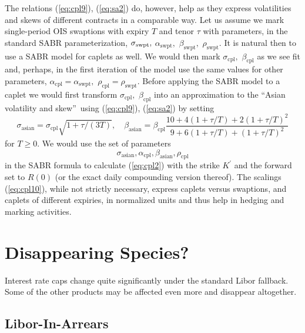 \documentclass{article}
\begin{document}
The relations (\ref{eq:cpl9}), (\ref{eq:sa2}) do, however, help as they
express volatilities and skews of different contracts in a comparable way.
Let us assume we mark single-period OIS swaptions with expiry $T$ and tenor $%
\tau $ with parameters, in the standard SABR parameterization, $\sigma _{%
\mathrm{swpt}},$ $\alpha _{\mathrm{swpt}},$ $\beta _{\mathrm{swpt}},$ $\rho
_{\mathrm{swpt}}$. It is natural then to use a SABR model for caplets as
well. We would then mark $\sigma _{\mathrm{cpl}},$ $\beta _{\mathrm{cpl}}$
as we see fit and, perhaps, in the first iteration of the model use the same
values for other parameters, $\alpha _{\mathrm{cpl}}=\alpha _{\mathrm{swpt}%
}, $ $\rho _{\mathrm{cpl}}=\rho _{\mathrm{swpt}}.$ Before applying the SABR
model to a caplet we would first transform $\sigma _{\mathrm{cpl}},$ $\beta
_{\mathrm{cpl}}$ into an approximation to the \textquotedblleft Asian
volatility and skew\textquotedblright\ using (\ref{eq:cpl9}), (\ref{eq:sa2})
by setting%
\begin{equation}
\sigma _{\mathrm{asian}}=\sigma _{\mathrm{cpl}}\sqrt{1+\tau /(3T)},\quad
\beta _{\mathrm{asian}}=\beta _{\mathrm{cpl}}\frac{10+4\left( 1+\tau
/T\right) +2\left( 1+\tau /T\right) ^{2}}{9+6\left( 1+\tau /T\right) +\left(
1+\tau /T\right) ^{2}}  \label{eq:cpl10}
\end{equation}%
for $T\geq 0$. We would use the set of parameters 
\begin{equation*}
\sigma _{\mathrm{asian}},\alpha _{\mathrm{cpl}},\beta _{\mathrm{asian}},\rho
_{\mathrm{cpl}}
\end{equation*}%
in the SABR formula to calculate (\ref{eq:cpl2}) with the strike $K^{\prime
} $ and the forward set to $R(0)$ (or the exact daily compounding version
thereof). The scalings (\ref{eq:cpl10}), while not strictly necessary,
express caplets versus swaptions, and caplets of different expiries, in
normalized units and thus help in hedging and marking activities.

\section{Disappearing Species?}

Interest rate caps change quite significantly under the standard Libor
fallback. Some of the other products may be affected even more and disappear
altogether.

\subsection{Libor-In-Arrears}
\end{document}
